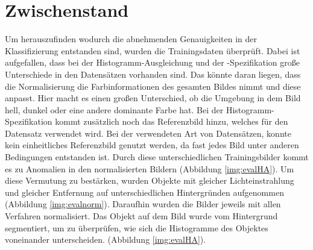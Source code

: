 \section{Zwischenstand}
Um herauszufinden wodurch die abnehmenden Genauigkeiten in der Klassifizierung entstanden sind, wurden die Trainingsdaten überprüft. Dabei ist aufgefallen, dass bei der Histogramm-Ausgleichung und der -Spezifikation große Unterschiede in den Datensätzen vorhanden sind. Das könnte daran liegen, dass die Normalisierung die Farbinformationen des gesamten Bildes nimmt und diese anpasst. Hier macht es einen großen Unterschied, ob die Umgebung in dem Bild hell, dunkel oder eine andere dominante Farbe hat. Bei der Histogramm-Spezifikation kommt zusätzlich noch das Referenzbild hinzu, welches für den Datensatz verwendet wird. Bei der verwendeten Art von Datensätzen, konnte kein einheitliches Referenzbild genutzt werden, da fast jedes Bild unter anderen Bedingungen entstanden ist. Durch diese unterschiedlichen Trainingsbilder kommt es zu Anomalien in den normalisierten Bildern (Abbildung \ref{img:evalHA}). Um diese Vermutung zu bestärken, wurden Objekte mit gleicher Lichteinstrahlung und gleicher Entfernung auf unterschiedlichen Hintergründen aufgenommen (Abbildung \ref{img:evalnorm}). Daraufhin wurden die Bilder jeweils mit allen Verfahren normalisiert. Das Objekt auf dem Bild wurde vom Hintergrund segmentiert, um zu überprüfen, wie sich die Histogramme des Objektes voneinander unterscheiden. (Abbildung \ref{img:evalHA}).\\
